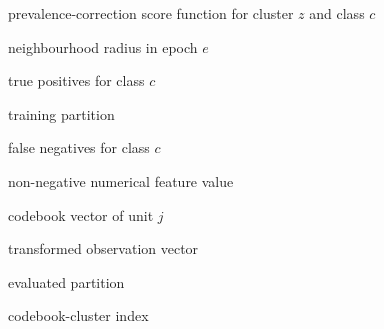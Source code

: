 \begin{list}{}{\setlength{\labelwidth}{.2\columnwidth}\setlength{\leftmargin}{.24\columnwidth}\setlength{\itemsep}{0pt}\setlength{\parsep}{0pt}\renewcommand{\makelabel}[1]{#1\hfil}}
\item[$s_{zc}$] prevalence-correction score function for cluster $z$ and class $c$
\item[$\sigma_e$] neighbourhood radius in epoch $e$
\item[$t_c$] true positives for class $c$
\item[$T$] training partition
\item[$u_c$] false negatives for class $c$
\item[$v$] non-negative numerical feature value
\item[$\mathbf{w}_j$] codebook vector of unit $j$
\item[$\mathbf{x}$] transformed observation vector
\item[$X$] evaluated partition
\item[$z$] codebook-cluster index
\end{list}
